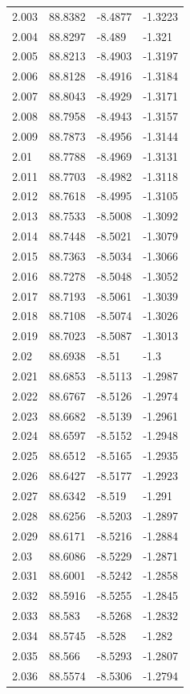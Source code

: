 \begin{tabular}{llll}
2.003 & 88.8382 & -8.4877 & -1.3223 \\
2.004 & 88.8297 & -8.489 & -1.321 \\
2.005 & 88.8213 & -8.4903 & -1.3197 \\
2.006 & 88.8128 & -8.4916 & -1.3184 \\
2.007 & 88.8043 & -8.4929 & -1.3171 \\
2.008 & 88.7958 & -8.4943 & -1.3157 \\
2.009 & 88.7873 & -8.4956 & -1.3144 \\
2.01 & 88.7788 & -8.4969 & -1.3131 \\
2.011 & 88.7703 & -8.4982 & -1.3118 \\
2.012 & 88.7618 & -8.4995 & -1.3105 \\
2.013 & 88.7533 & -8.5008 & -1.3092 \\
2.014 & 88.7448 & -8.5021 & -1.3079 \\
2.015 & 88.7363 & -8.5034 & -1.3066 \\
2.016 & 88.7278 & -8.5048 & -1.3052 \\
2.017 & 88.7193 & -8.5061 & -1.3039 \\
2.018 & 88.7108 & -8.5074 & -1.3026 \\
2.019 & 88.7023 & -8.5087 & -1.3013 \\
2.02 & 88.6938 & -8.51 & -1.3 \\
2.021 & 88.6853 & -8.5113 & -1.2987 \\
2.022 & 88.6767 & -8.5126 & -1.2974 \\
2.023 & 88.6682 & -8.5139 & -1.2961 \\
2.024 & 88.6597 & -8.5152 & -1.2948 \\
2.025 & 88.6512 & -8.5165 & -1.2935 \\
2.026 & 88.6427 & -8.5177 & -1.2923 \\
2.027 & 88.6342 & -8.519 & -1.291 \\
2.028 & 88.6256 & -8.5203 & -1.2897 \\
2.029 & 88.6171 & -8.5216 & -1.2884 \\
2.03 & 88.6086 & -8.5229 & -1.2871 \\
2.031 & 88.6001 & -8.5242 & -1.2858 \\
2.032 & 88.5916 & -8.5255 & -1.2845 \\
2.033 & 88.583 & -8.5268 & -1.2832 \\
2.034 & 88.5745 & -8.528 & -1.282 \\
2.035 & 88.566 & -8.5293 & -1.2807 \\
2.036 & 88.5574 & -8.5306 & -1.2794 \\

\end{tabular}
